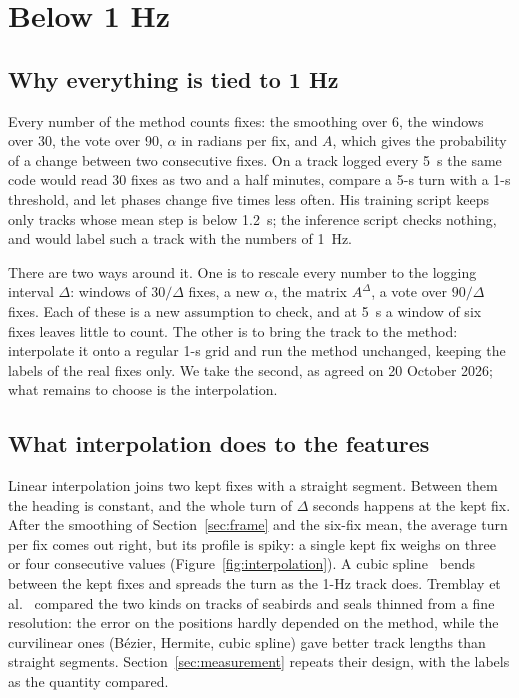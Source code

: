 \section{Below 1 Hz}\label{sec:cadence}

\subsection{Why everything is tied to 1 Hz}

Every number of the method counts fixes: the smoothing over 6, the windows over 30, the vote over
90, $\alpha$ in radians per fix, and $A$, which gives the probability of a change between two
consecutive fixes. On a track logged every 5~s the same code would read 30 fixes as two and a half
minutes, compare a 5-s turn with a 1-s threshold, and let phases change five times less often. His
training script keeps only tracks whose mean step is below 1.2~s; the inference script checks
nothing, and would label such a track with the numbers of 1~Hz.

There are two ways around it. One is to rescale every number to the logging interval $\Delta$:
windows of $30/\Delta$ fixes, a new $\alpha$, the matrix $A^\Delta$, a vote over $90/\Delta$ fixes.
Each of these is a new assumption to check, and at 5~s a window of six fixes leaves little to
count. The other is to bring the track to the method: interpolate it onto a regular 1-s grid and
run the method unchanged, keeping the labels of the real fixes only. We take the second, as agreed
on 20 October 2026; what remains to choose is the interpolation.

\subsection{What interpolation does to the features}

Linear interpolation joins two kept fixes with a straight segment. Between them the heading is
constant, and the whole turn of $\Delta$ seconds happens at the kept fix. After the smoothing of
Section~\ref{sec:frame} and the six-fix mean, the average turn per fix comes out right, but its
profile is spiky: a single kept fix weighs on three or four consecutive values
(Figure~\ref{fig:interpolation}). A cubic spline~\cite{deboor2001} bends between the kept fixes
and spreads the turn as the 1-Hz track does. Tremblay et al.~\cite{tremblay2006} compared the
two kinds on tracks of seabirds and seals thinned from a fine resolution: the error on the
positions hardly depended on the method, while the curvilinear ones (Bézier, Hermite, cubic
spline) gave better track lengths than straight segments. Section~\ref{sec:measurement} repeats
their design, with the labels as the quantity compared.

